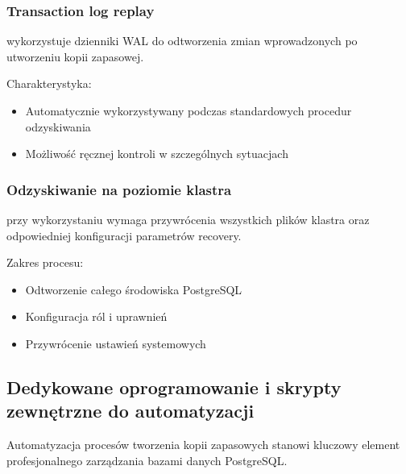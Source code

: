 \documentclass[a4paper,11pt,openany,english]{sphinxmanual}
\begin{document}
\subsubsection{Transaction log replay}
\label{\detokenize{rozdzial2/Kopie_zapasowe_i_odzyskiwanie_danych/kopie_zapasowe_i_odzyskiwanie_danych:transaction-log-replay}}
\sphinxAtStartPar
{} wykorzystuje dzienniki WAL do odtworzenia zmian wprowadzonych po utworzeniu kopii zapasowej.

\sphinxAtStartPar
Charakterystyka:
\begin{itemize}
\item {} 
\sphinxAtStartPar
Automatycznie wykorzystywany podczas standardowych procedur odzyskiwania

\item {} 
\sphinxAtStartPar
Możliwość ręcznej kontroli w szczególnych sytuacjach

\end{itemize}


\subsubsection{Odzyskiwanie na poziomie klastra}
\label{\detokenize{rozdzial2/Kopie_zapasowe_i_odzyskiwanie_danych/kopie_zapasowe_i_odzyskiwanie_danych:odzyskiwanie-na-poziomie-klastra}}
\sphinxAtStartPar
{} przy wykorzystaniu  wymaga przywrócenia wszystkich plików klastra oraz odpowiedniej konfiguracji parametrów recovery.

\sphinxAtStartPar
Zakres procesu:
\begin{itemize}
\item {} 
\sphinxAtStartPar
Odtworzenie całego środowiska PostgreSQL

\item {} 
\sphinxAtStartPar
Konfiguracja ról i uprawnień

\item {} 
\sphinxAtStartPar
Przywrócenie ustawień systemowych

\end{itemize}


\subsection{Dedykowane oprogramowanie i skrypty zewnętrzne do automatyzacji}
\label{\detokenize{rozdzial2/Kopie_zapasowe_i_odzyskiwanie_danych/kopie_zapasowe_i_odzyskiwanie_danych:dedykowane-oprogramowanie-i-skrypty-zewnetrzne-do-automatyzacji}}
\sphinxAtStartPar
Automatyzacja procesów tworzenia kopii zapasowych stanowi kluczowy element profesjonalnego zarządzania bazami danych PostgreSQL.
\end{document}
